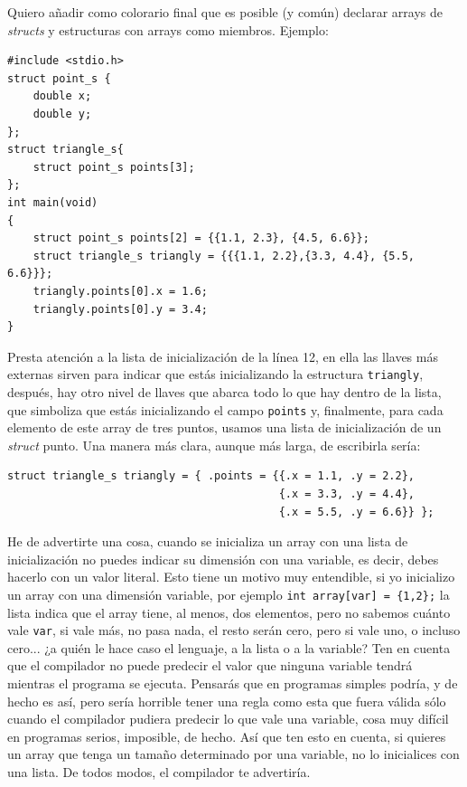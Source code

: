 \documentclass[a4paper]{article}
\begin{document}
Quiero añadir como colorario final que es posible (y común) declarar arrays de
\textit{structs} y estructuras con arrays como miembros. Ejemplo:


\noindent
\begin{minipage}[H]{\linewidth}
\mbox{}
\begin{lstlisting}[style=C,
caption={Combinación \textit{struct} con array},
label={lst:exampleArrayStruct}]
#include <stdio.h>
struct point_s {
    double x;
    double y;
};
struct triangle_s{
    struct point_s points[3];
};
int main(void)
{
    struct point_s points[2] = {{1.1, 2.3}, {4.5, 6.6}};
    struct triangle_s triangly = {{{1.1, 2.2},{3.3, 4.4}, {5.5, 6.6}}};
    triangly.points[0].x = 1.6;
    triangly.points[0].y = 3.4;
}
\end{lstlisting}
\end{minipage}

Presta atención a la lista de inicialización de la línea 12, en ella las llaves
más externas sirven para indicar que estás inicializando la estructura
\verb!triangly!, después, hay otro nivel de llaves que abarca todo lo que hay
dentro de la lista, que simboliza que estás inicializando el campo
\verb!points! y, finalmente, para cada elemento de este array de tres puntos,
usamos una lista de inicialización de un \emph{struct} punto. Una manera más
clara, aunque más larga, de escribirla sería:

\noindent
\begin{minipage}[H]{\linewidth}
\begin{lstlisting}[style=C]
struct triangle_s triangly = { .points = {{.x = 1.1, .y = 2.2},
                                          {.x = 3.3, .y = 4.4},
                                          {.x = 5.5, .y = 6.6}} };
\end{lstlisting}
\end{minipage}

He de advertirte una cosa, cuando se inicializa un array con una lista de
inicialización no puedes indicar su dimensión con una variable, es decir,
debes hacerlo con un valor literal. Esto tiene un motivo muy entendible, si
yo inicializo un array con una dimensión variable, por ejemplo
\verb!int array[var] = {1,2};! la lista indica que el array
tiene, al menos, dos elementos, pero no sabemos cuánto vale \verb!var!, si
vale más, no pasa nada, el resto serán cero, pero si vale uno, o incluso cero...
¿a quién le hace caso el lenguaje, a la lista o a la variable? Ten en cuenta
que el compilador no puede predecir el valor que ninguna variable tendrá
mientras el programa se ejecuta. Pensarás que en programas simples podría,
y de hecho
es así, pero sería horrible tener una regla como esta que fuera válida sólo
cuando el compilador pudiera predecir lo que vale una variable, cosa muy
difícil en programas serios, imposible, de hecho.
Así que ten esto en cuenta, si quieres un array que tenga un tamaño determinado
por una variable, no lo inicialices con una lista. De todos modos, el compilador
te advertiría.
\end{document}
